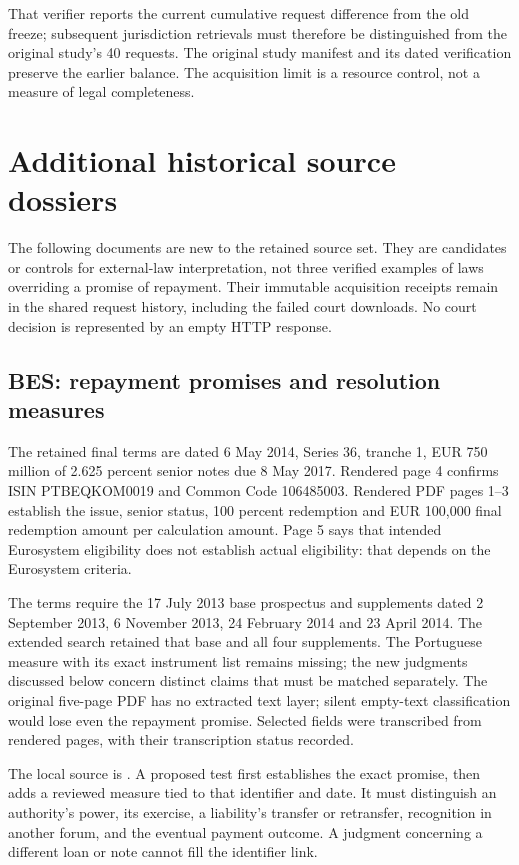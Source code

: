 \documentclass[12pt,a4paper,oneside,openany]{book}
\begin{document}
That verifier reports the current cumulative request difference from the old
freeze; subsequent jurisdiction retrievals must therefore be distinguished
from the original study's 40 requests. The original study manifest and its
dated verification preserve the earlier balance. The acquisition limit is
a resource control, not a measure of legal completeness.


\section{Additional historical source dossiers}
\label{app:jurisdiction-candidates}

The following documents are new to the retained source set. They are
candidates or controls for external-law interpretation, not three verified
examples of laws overriding a promise of repayment. Their immutable acquisition
receipts remain in the shared request history, including the failed court
downloads. No court decision is represented by an empty HTTP response.

\subsection{BES: repayment promises and resolution measures}

The retained final terms are dated 6 May 2014, Series 36, tranche 1,
EUR 750 million of 2.625 percent senior notes due 8 May 2017. Rendered
page 4 confirms ISIN PTBEQKOM0019 and Common Code 106485003.
Rendered PDF pages 1--3 establish the issue, senior status, 100 percent
redemption and EUR 100,000 final redemption amount per calculation amount.
Page 5 says that intended Eurosystem eligibility does not establish actual
eligibility: that depends on the Eurosystem criteria.

The terms require the 17 July 2013 base prospectus and supplements dated
2 September 2013, 6 November 2013, 24 February 2014 and 23 April 2014.
The extended search retained that base and all four supplements. The
Portuguese measure with its exact instrument list remains missing; the
new judgments discussed below concern distinct claims that must be matched
separately. The original
five-page PDF has no extracted text layer; silent empty-text classification
would lose even the repayment promise. Selected fields were transcribed
from rendered pages, with their transcription status recorded.

The local source is
.
A proposed test first establishes the exact promise, then adds a reviewed
measure tied to that identifier and date. It must distinguish an authority's
power, its exercise, a liability's transfer or retransfer, recognition in
another forum, and the eventual payment outcome. A judgment concerning a
different loan or note cannot fill the identifier link.
\end{document}
